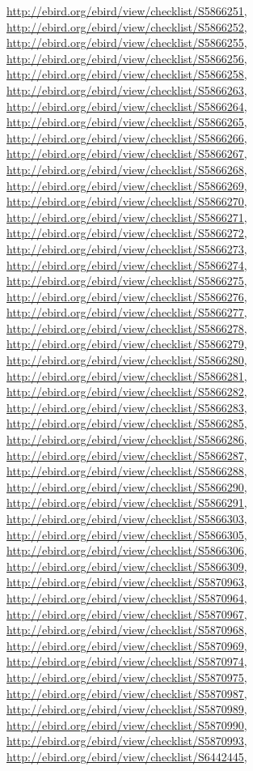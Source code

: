 \documentclass[9pt, article]{memoir}
\begin{document}
\begin{multicols}{2}
\url{http://ebird.org/ebird/view/checklist/S5866251}, 
\url{http://ebird.org/ebird/view/checklist/S5866252}, 
\url{http://ebird.org/ebird/view/checklist/S5866255}, 
\url{http://ebird.org/ebird/view/checklist/S5866256}, 
\url{http://ebird.org/ebird/view/checklist/S5866258}, 
\url{http://ebird.org/ebird/view/checklist/S5866263}, 
\url{http://ebird.org/ebird/view/checklist/S5866264}, 
\url{http://ebird.org/ebird/view/checklist/S5866265}, 
\url{http://ebird.org/ebird/view/checklist/S5866266}, 
\url{http://ebird.org/ebird/view/checklist/S5866267}, 
\url{http://ebird.org/ebird/view/checklist/S5866268}, 
\url{http://ebird.org/ebird/view/checklist/S5866269}, 
\url{http://ebird.org/ebird/view/checklist/S5866270}, 
\url{http://ebird.org/ebird/view/checklist/S5866271}, 
\url{http://ebird.org/ebird/view/checklist/S5866272}, 
\url{http://ebird.org/ebird/view/checklist/S5866273}, 
\url{http://ebird.org/ebird/view/checklist/S5866274}, 
\url{http://ebird.org/ebird/view/checklist/S5866275}, 
\url{http://ebird.org/ebird/view/checklist/S5866276}, 
\url{http://ebird.org/ebird/view/checklist/S5866277}, 
\url{http://ebird.org/ebird/view/checklist/S5866278}, 
\url{http://ebird.org/ebird/view/checklist/S5866279}, 
\url{http://ebird.org/ebird/view/checklist/S5866280}, 
\url{http://ebird.org/ebird/view/checklist/S5866281}, 
\url{http://ebird.org/ebird/view/checklist/S5866282}, 
\url{http://ebird.org/ebird/view/checklist/S5866283}, 
\url{http://ebird.org/ebird/view/checklist/S5866285}, 
\url{http://ebird.org/ebird/view/checklist/S5866286}, 
\url{http://ebird.org/ebird/view/checklist/S5866287}, 
\url{http://ebird.org/ebird/view/checklist/S5866288}, 
\url{http://ebird.org/ebird/view/checklist/S5866290}, 
\url{http://ebird.org/ebird/view/checklist/S5866291}, 
\url{http://ebird.org/ebird/view/checklist/S5866303}, 
\url{http://ebird.org/ebird/view/checklist/S5866305}, 
\url{http://ebird.org/ebird/view/checklist/S5866306}, 
\url{http://ebird.org/ebird/view/checklist/S5866309}, 
\url{http://ebird.org/ebird/view/checklist/S5870963}, 
\url{http://ebird.org/ebird/view/checklist/S5870964}, 
\url{http://ebird.org/ebird/view/checklist/S5870967}, 
\url{http://ebird.org/ebird/view/checklist/S5870968}, 
\url{http://ebird.org/ebird/view/checklist/S5870969}, 
\url{http://ebird.org/ebird/view/checklist/S5870974}, 
\url{http://ebird.org/ebird/view/checklist/S5870975}, 
\url{http://ebird.org/ebird/view/checklist/S5870987}, 
\url{http://ebird.org/ebird/view/checklist/S5870989}, 
\url{http://ebird.org/ebird/view/checklist/S5870990}, 
\url{http://ebird.org/ebird/view/checklist/S5870993}, 
\url{http://ebird.org/ebird/view/checklist/S6442445}, 

\end{multicols}
\end{document}

